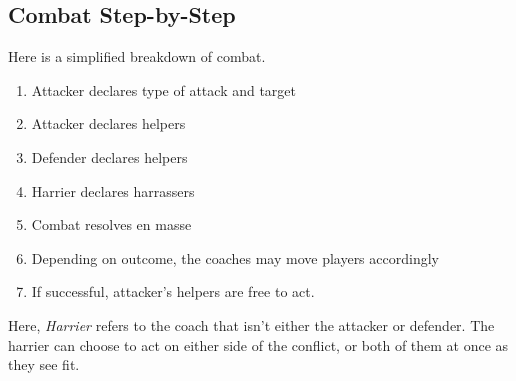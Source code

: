 \subsection{Combat Step-by-Step}\label{combat-step-by-step}
Here is a simplified breakdown of combat.
\begin{enumerate}
    \item Attacker declares type of attack and target
    \item Attacker declares helpers
    \item Defender declares helpers
    \item Harrier declares harrassers
    \item Combat resolves en masse
    \item Depending on outcome, the coaches may move players accordingly
    \item If successful, attacker's helpers are free to act.
\end{enumerate}

\begin{note}
Here, \textit{Harrier} refers to the coach that isn't either the attacker or defender. 
The harrier can choose to act on either side of the conflict, or both of them at once as they see fit.
\end{note}

